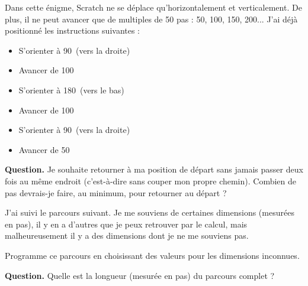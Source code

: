 \documentclass[class=report,crop=false, 12pt]{standalone}
\begin{document}


\begin{enigme}
Dans cette énigme, Scratch ne se déplace qu'horizontalement et verticalement. De plus, il ne peut avancer que de multiples de 50 pas : 50, 100, 150, 200...
J'ai déjà positionné les instructions suivantes :
\begin{itemize}
  \item S'orienter à 90\textdegree\ (vers la droite)
  \item Avancer de 100
  \item S'orienter à 180\textdegree\  (vers le bas)
  \item Avancer de 100
  \item S'orienter à 90\textdegree\  (vers la droite)
  \item Avancer de 50  
\end{itemize}

\bigskip

\textbf{Question.} Je souhaite retourner à ma position de départ sans jamais passer deux fois au même endroit (c'est-à-dire sans couper mon propre chemin). Combien de pas devrais-je faire, au minimum, pour retourner au départ ? 




\end{enigme}


\begin{enigme}

J'ai suivi le parcours suivant. 
Je me souviens de certaines dimensions (mesurées en pas), il y en a d'autres que je peux retrouver par le calcul, mais malheureusement il y a des dimensions dont je ne me souviens pas.

Programme ce parcours en choisissant des valeurs pour les dimensions inconnues.


\bigskip

\textbf{Question.} Quelle est  la longueur (mesurée en pas) du parcours complet ?



\end{enigme}
\end{document}
